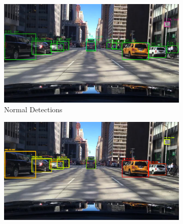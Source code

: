     
    \begin{figure}[H]
     \captionsetup[table]{skip=0pt}
    	\centering
    	\begin{subfigure}[t]{0.495\textwidth}
    		\centering
    		\includegraphics[width=\textwidth]{images/det_images/bdd_1.jpg}
    		\caption{Normal Detections}
    	\end{subfigure}
    	\begin{subfigure}[t]{0.495\textwidth}
    		\centering
    		\includegraphics[width=\textwidth]{images/det_images/bdd_bnn_entropies_1.png}

\end{subfigure}
\end{figure}
